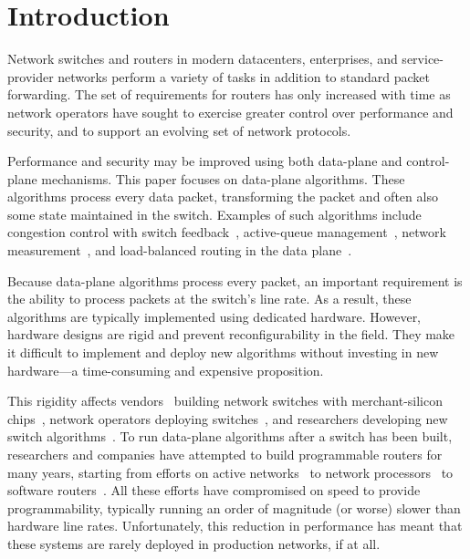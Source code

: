 \section{Introduction}
\label{s:intro}

Network switches and routers in modern datacenters, enterprises, and
service-provider networks perform a variety of tasks in addition to standard
packet forwarding. The set of requirements for routers has only increased with
time as network operators have sought to exercise greater control over
performance and security, and to support an evolving set of network protocols.

Performance and security may be improved using both data-plane and
control-plane mechanisms. This paper focuses on data-plane algorithms. These
algorithms process every data packet, transforming the packet and often also
some state maintained in the switch.  Examples of such algorithms include
congestion control with switch feedback~\cite{xcp, rcp, pdq, dctcp},
active-queue management~\cite{red,blue,avq,codel,pie}, network
measurement~\cite{opensketch, bitmap_george, elephant_george}, and
load-balanced routing in the data plane~\cite{conga}.

Because data-plane algorithms process every packet, an important requirement is
the ability to process packets at the switch's line rate.  As a result, these
algorithms are typically implemented using dedicated hardware. However,
hardware designs are rigid and prevent reconfigurability in the field. They
make it difficult to implement and deploy new algorithms without investing in
new hardware---a time-consuming and expensive proposition.

This rigidity affects vendors~\cite{cisco_nexus, dell_force10, arista_7050}
building network switches with merchant-silicon chips~\cite{trident, tomahawk,
mellanox}, network operators deploying switches~\cite{google,facebook,vl2}, and
researchers developing new switch algorithms~\cite{xcp, codel, d3, detail,
pdq}.  To run data-plane algorithms after a switch has been built, researchers
and companies have attempted to build programmable routers for many years,
starting from efforts on active networks~\cite{active-nets} to network
processors~\cite{npu_survey} to software routers~\cite{click,routebricks}. All
these efforts have compromised on speed to provide programmability, typically
running an order of magnitude (or worse) slower than hardware line rates.
Unfortunately, this reduction in performance has meant that these systems are
rarely deployed in production networks, if at all.


